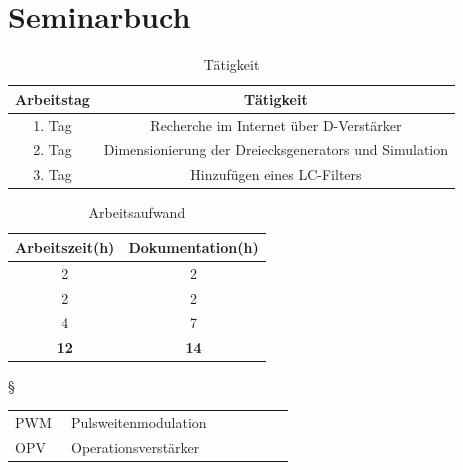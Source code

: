 \documentclass[11pt,a4paper,bibtotoc,oneside]{scrbook}
\begin{document}
\chapter{Seminarbuch}
\begin{table}[htbp]
  \centering
  \captionsetup{margin=1pt,font=small,labelfont=bf}
  \caption{Tätigkeit}
    \begin{tabular}{| c | c| }\hline
    {\bf Arbeitstag} &{\bf Tätigkeit} \\\hline
    \hline
    1. Tag   & Recherche im Internet über D-Verstärker  \\
    2. Tag   & Dimensionierung der Dreiecksgenerators und Simulation \\
    3. Tag   & Hinzufügen eines LC-Filters  \\
    \hline
    \end{tabular}%
  \label{tab:addlabel}%
\end{table}%
\begin{table}[htbp]
  \centering
    \captionsetup{margin=1pt,font=small,labelfont=bf}
      \caption{Arbeitsaufwand}
      \begin{tabular}{| c | c |}\hline
      {\bf Arbeitszeit(h)} &{\bf Dokumentation(h)} \\\hline
      \hline
        2   & 2 \\
        2   & 2 \\
        4   & 7 \\
      \hline
        \textbf{12}   & \textbf{14} \\
      \hline
      \end{tabular}%
    \label{tab:addlabel}%
\end{table}%






\restoregeometry


§

%

\hspace{-17mm}\begin{tabular}{>{\raggedleft}p{0.2\linewidth} p{0.75\linewidth} p{0.1\linewidth}}
PWM & Pulsweitenmodulation \\
OPV & Operationsverstärker
\end{tabular}
\end{document}
